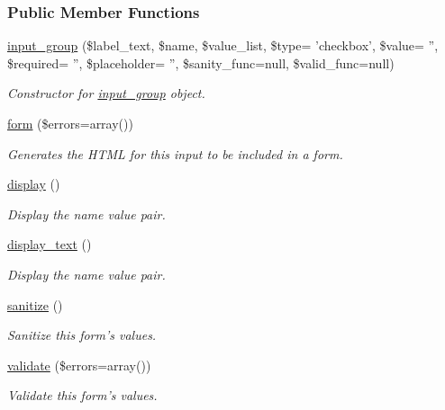 \subsubsection*{Public Member Functions}
\begin{DoxyCompactItemize}
\item 
\hyperlink{classinput__group_aef532e921771fbfccacbdefba1db7dce}{input\-\_\-group} (\$label\-\_\-text, \$name, \$value\-\_\-list, \$type= 'checkbox', \$value= '', \$required= '', \$placeholder= '', \$sanity\-\_\-func=null, \$valid\-\_\-func=null)
\begin{DoxyCompactList}\small\item\em Constructor for \hyperlink{classinput__group}{input\-\_\-group} object. \end{DoxyCompactList}\item 
\hyperlink{classinput__group_a67f5d8e4ac86e75313e8d0d8696b7b35}{form} (\$errors=array())
\begin{DoxyCompactList}\small\item\em Generates the H\-T\-M\-L for this input to be included in a form. \end{DoxyCompactList}\item 
\hyperlink{classinput__group_a91e1b3cab54b81c21ab5f88a2f4f5c6a}{display} ()
\begin{DoxyCompactList}\small\item\em Display the name value pair. \end{DoxyCompactList}\item 
\hyperlink{classinput__group_aac74288da2e6c962dc507ccaa1f8f450}{display\-\_\-text} ()
\begin{DoxyCompactList}\small\item\em Display the name value pair. \end{DoxyCompactList}\item 
\hyperlink{classinput__group_a4f0f7f8aeb74550c99114f28dca449cb}{sanitize} ()
\begin{DoxyCompactList}\small\item\em Sanitize this form's values. \end{DoxyCompactList}\item 
\hyperlink{classinput__group_ae0461a6034effccc3ca6bf34b6539cdd}{validate} (\$errors=array())
\begin{DoxyCompactList}\small\item\em Validate this form's values. \end{DoxyCompactList}\end{DoxyCompactItemize}
